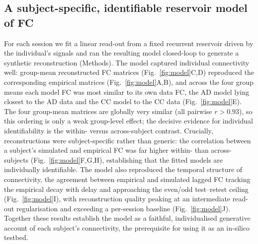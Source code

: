 \documentclass[11pt]{article}
\begin{document}
\subsection*{A subject-specific, identifiable reservoir model of FC}
For each session we fit a linear read-out from a fixed recurrent reservoir
driven by the individual's signals and ran the resulting model closed-loop to
generate a synthetic reconstruction (Methods). The model captured
individual connectivity well: group-mean reconstructed FC matrices
(Fig.~\ref{fig:model}C,D) reproduced the corresponding empirical matrices
(Fig.~\ref{fig:model}A,B), and across the four group means each model FC was
most similar to its own data FC, the AD model lying closest to the AD data and
the CC model to the CC data (Fig.~\ref{fig:model}E). The four group-mean matrices
are globally very similar (all pairwise $r>0.93$), so this ordering is only a weak
group-level effect; the decisive evidence for individual identifiability is the
within- versus across-subject contrast. Crucially, reconstructions
were subject-specific rather than generic: the correlation between a subject's
simulated and empirical FC was far higher within- than across-subjects
(Fig.~\ref{fig:model}F,G,H), establishing that the fitted models are
individually identifiable. The model also reproduced the temporal structure of
connectivity, the agreement between empirical and simulated lagged FC tracking
the empirical decay with delay and approaching the even/odd test--retest
ceiling (Fig.~\ref{fig:model}I), with reconstruction quality peaking at an
intermediate read-out regularisation and exceeding a per-session baseline
(Fig.~\ref{fig:model}J). Together these results establish the model as a
faithful, individualised generative account of each subject's
connectivity, the prerequisite for using it as an in-silico testbed.
\end{document}
